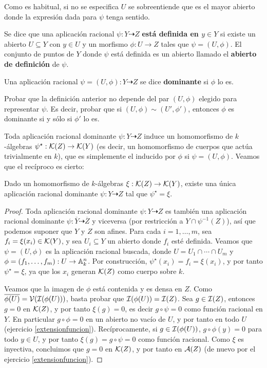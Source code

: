 \documentclass[ACGA.tex]{subfiles}
\begin{document}
Como es habitual, si no se especifica $U$ se sobreentiende que es el mayor abierto donde la expresión dada para $\psi$ tenga sentido.

\begin{defi}
 Se dice que una aplicación racional $\psi:Y\dashrightarrow Z$ {\bf está definida en $y\in Y$} si existe un abierto $U\subseteq Y$ con $y\in U$ y un morfismo $\phi:U\to Z$ tales que $\psi=(U,\phi)$. El conjunto de puntos de $Y$ donde $\psi$ está definida es un abierto llamado el {\bf abierto de definición} de $\psi$.
\end{defi}

\begin{defi}
 Una aplicación racional $\psi=(U,\phi):Y\dashrightarrow Z$ se dice {\bf dominante} si $\phi$ lo es.
\end{defi}

\begin{ejer}
 Probar que la definición anterior no depende del par $(U,\phi)$ elegido para representar $\psi$. Es decir, probar que si $(U,\phi)\sim(U',\phi')$, entonces $\phi$ es dominante si y sólo si $\phi'$ lo es.
\end{ejer}

Toda aplicación racional dominante $\psi:Y\dashrightarrow Z$ induce un homomorfismo de $k$-álgebras $\psi^\star:{\mathcal K}(Z)\to{\mathcal K}(Y)$ (es decir, un homomorfismo de cuerpos que actúa trivialmente en $k$), que es simplemente el inducido por $\phi$ si $\psi=(U,\phi)$. Veamos que el recíproco es cierto:

\begin{prop}\label{morfismoaracional}
 Dado un homomorfismo de $k$-álgebras $\xi:{\mathcal K}(Z)\to{\mathcal K}(Y)$, existe una única aplicación racional dominante $\psi:Y\dashrightarrow Z$ tal que $\psi^\star=\xi$.
\end{prop}

\begin{proof}
 Toda aplicación racional dominante $\psi:Y\dashrightarrow Z$ es también una aplicación racional dominante $\psi:\overline Y\dashrightarrow\overline Z$ y viceversa (por restricción a $Y\cap\psi^{-1}(Z)$), así que podemos suponer que $Y$ y $Z$ son afines. Para cada $i=1,\ldots,m$, sea $f_i=\xi(x_i)\in{\mathcal K}(Y)$, y sea $U_i\subseteq Y$ un abierto donde $f_i$ esté definida. Veamos que $\psi=(U,\phi)$ es la aplicación racional buscada, donde $U=U_1\cap\cdots\cap U_m$ y $\phi=(f_1,\ldots,f_m): U\to\mathbb{A}^n_k$. Por construcción, $\psi^\star(x_i)=f_i=\xi(x_i)$, y por tanto $\psi^\star=\xi$, ya que los $x_i$ generan ${\mathcal K}(Z)$ como cuerpo sobre $k$.

 Veamos que la imagen de $\phi$ está contenida y es densa en $Z$. Como $\overline{\phi(U)}=\mathcal{V}(\mathcal{I}(\phi(U)))$, basta probar que $\mathcal{I}(\phi(U))=\mathcal{I}(Z)$. Sea $g\in\mathcal{I}(Z)$, entonces $g=0$ en ${\mathcal K}(Z)$, y por tanto $\xi(g)=0$, es decir $g\circ\psi=0$ como función racional en $Y$. En particular $g\circ\phi=0$ en un abierto no vacío de $U$, y por tanto en todo $U$ (ejercicio \ref{extensionfuncion}). Recíprocamente, si $g\in\mathcal{I}(\phi(U))$, $g\circ\phi(y)=0$ para todo $y\in U$, y por tanto $\xi(g)=g\circ\psi=0$ como función racional. Como $\xi$ es inyectiva, concluimos que $g=0$ en ${\mathcal K}(Z)$, y por tanto en $\mathcal{A}(Z)$ (de nuevo por el ejercicio \ref{extensionfuncion}).
\end{proof}
\end{document}
